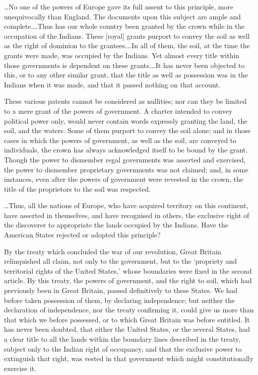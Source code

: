 \ldots No one of the powers of Europe gave its full assent to this principle,
more unequivocally than England. The documents upon this subject are ample and
complete.\ldots Thus has our whole country been granted by the crown while in
the occupation of the Indians. These [royal] grants purport to convey the soil
as well as the right of dominion to the grantees.\ldots In all of them, the
soil, at the time the grants were made, was occupied by the Indians. Yet almost
every title within those governments is dependent on these grants.\ldots It has
never been objected to this, or to any other similar grant, that the title as
well as possession was in the Indians when it was made, and that it passed
nothing on that account.

These various patents cannot be considered as nullities; nor can they be limited
to a mere grant of the powers of government. A charter intended to convey
political power only, would never contain words expressly granting the land, the
soil, and the waters. Some of them purport to convey the soil alone; and in
those cases in which the powers of government, as well as the soil, are conveyed
to individuals, the crown has always acknowledged itself to be bound by the
grant. Though the power to dismember regal governments was asserted and
exercised, the power to dismember proprietary governments was not claimed; and,
in some instances, even after the powers of government were revested in the
crown, the title of the proprietors to the soil was respected.

\ldots Thus, all the nations of Europe, who have acquired territory on this
continent, have asserted in themselves, and have recognised in others, the
exclusive right of the discoverer to appropriate the lands occupied by the
Indians. Have the American States rejected or adopted this principle?

By the treaty which concluded the war of our revolution, Great Britain
relinquished all claim, not only to the government, but to the `propriety and
territorial rights of the United States,' whose boundaries were fixed in the
second article. By this treaty, the powers of government, and the right to soil,
which had previously been in Great Britain, passed definitively to these States.
We had before taken possession of them, by declaring independence; but neither
the declaration of independence, nor the treaty confirming it, could give us
more than that which we before possessed, or to which Great Britain was before
entitled. It has never been doubted, that either the United States, or the
several States, had a clear title to all the lands within the boundary lines
described in the treaty, subject only to the Indian right of occupancy, and that
the exclusive power to extinguish that right, was vested in that government
which might constitutionally exercise it.

